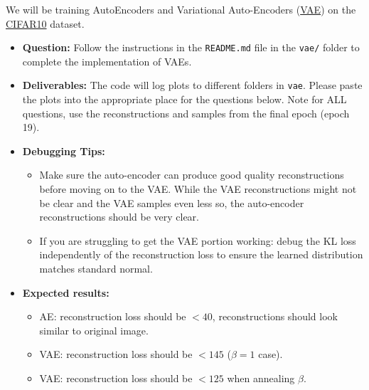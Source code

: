 \documentclass[11pt,addpoints,answers]{exam}
\numberwithin{equation}{section} %
\numberwithin{figure}{section} %
\numberwithin{table}{section} %
\begin{document}
We will be training AutoEncoders and Variational Auto-Encoders (\href{https://arxiv.org/abs/1312.6114}{VAE}) on the \href{https://www.cs.toronto.edu/~kriz/cifar.html}{CIFAR10} dataset.

\begin{itemize}
\item \textbf{Question:} Follow the instructions in the \texttt{README.md} file in the \texttt{vae/} folder to complete the implementation of VAEs.
\item \textbf{Deliverables:} The code will log plots to different folders in \texttt{vae}. Please paste the plots into the appropriate place for the questions below. Note for ALL questions, use the reconstructions and samples from the final epoch (epoch 19). 
\item \textbf{Debugging Tips:}
    \begin{itemize}
        \item Make sure the auto-encoder can produce good quality reconstructions before moving on to the VAE. 
        While the VAE reconstructions might not be clear and the VAE samples even less so, the auto-encoder reconstructions should be very clear.
        \item If you are struggling to get the VAE portion working: debug the KL loss independently of the reconstruction loss to ensure the learned distribution matches standard normal. 
    \end{itemize}
\item \textbf{Expected results:}
    \begin{itemize}
        \item AE: reconstruction loss should be $<40$, reconstructions should look similar to original image.
        \item VAE: reconstruction loss should be $< 145$ ($\beta=1$ case).
        \item VAE: reconstruction loss should be $< 125$ when annealing $\beta$.
    \end{itemize}
\end{itemize}
\newpage
\end{document}
